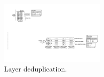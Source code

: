 
\begin{figure}[t]
	\centering
	\centering
	\includegraphics[width=0.45\textwidth]{graphs/sys-architecture-put-layer.pdf}
	\caption{Layer deduplication.}
	\label{fig:dedup-partition}
\end{figure}





